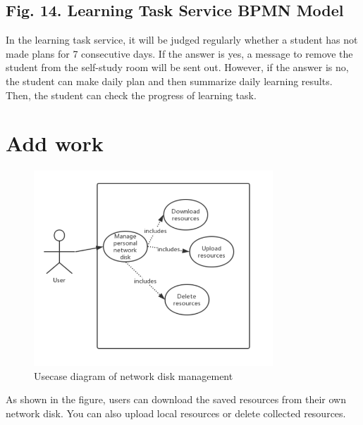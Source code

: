 \documentclass[runningheads]{llncs}
\begin{document}
\subsection{Fig. 14. Learning Task Service BPMN Model}
In the learning task service, it will be judged regularly whether a student has not made plans for 7 consecutive days. If the answer is yes, a message to remove the student from the self-study room will be sent out. However, if the answer is no, the student can make daily plan and then summarize daily learning results. Then, the student can check the progress of learning task.
\section{Add work}

\begin{figure}[H]
		\centering %
		\includegraphics[width=0.8\textwidth]{./figure/Hyy/Usecase} %
		\caption{Usecase diagram of network disk management} %
		\label{usecase} %

	\end{figure}
As shown in the figure, users can download the saved resources from their own network disk. You can also upload local resources or delete collected resources.
\end{document}
